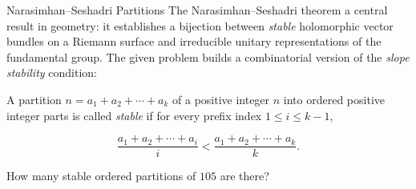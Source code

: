 \begin{problem}{Narasimhan–Seshadri Partitions}
    The Narasimhan–Seshadri theorem a central result in geometry: it establishes a bijection between \textit{stable} holomorphic vector bundles on a Riemann surface and irreducible unitary representations of the fundamental group. The given problem builds a combinatorial version of the \textit{slope stability} condition:

    A partition \(n = a_1 + a_2 + \cdots + a_k\) of a positive integer \(n\) into ordered positive integer parts is called \textit{stable} if for every prefix index \(1 \le i \le k-1\),

    \[
    \frac{a_1 + a_2 + \cdots + a_i}{i} < \frac{a_1 + a_2 + \cdots + a_k}{k}.
    \]

    How many stable ordered partitions of \(105\) are there?
\end{problem}
